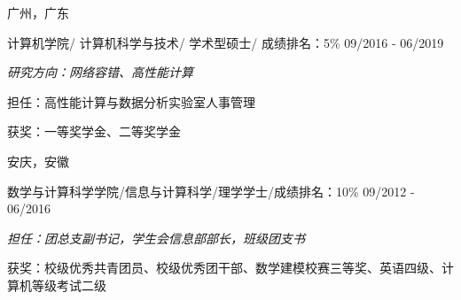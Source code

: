 \vspace{-6.0mm}

\begin{cventries}
\vspace{-2mm}
\cveducation
{}
{广州，广东}

\cvsubeducation
{计算机学院/ 计算机科学与技术/ 学术型硕士/ 成绩排名：5\%}
{09/2016 - 06/2019}
{
    \begin{cvitems}
    \item {\itshape{研究方向：网络容错、高性能计算}}
    \item {担任：高性能计算与数据分析实验室人事管理  }
    \item {获奖：一等奖学金、二等奖学金  }
    \end{cvitems}
}

\cveducation
{}
{安庆，安徽}

\cvsubeducation
{数学与计算科学学院/信息与计算科学/理学学士/成绩排名：10\%}
{09/2012 - 06/2016}
{
    \begin{cvitems}
    \item {\itshape{担任：团总支副书记，学生会信息部部长，班级团支书}}
    \item {获奖：校级优秀共青团员、校级优秀团干部、数学建模校赛三等奖、英语四级、计算机等级考试二级 }
    \end{cvitems}
}
\end{cventries}